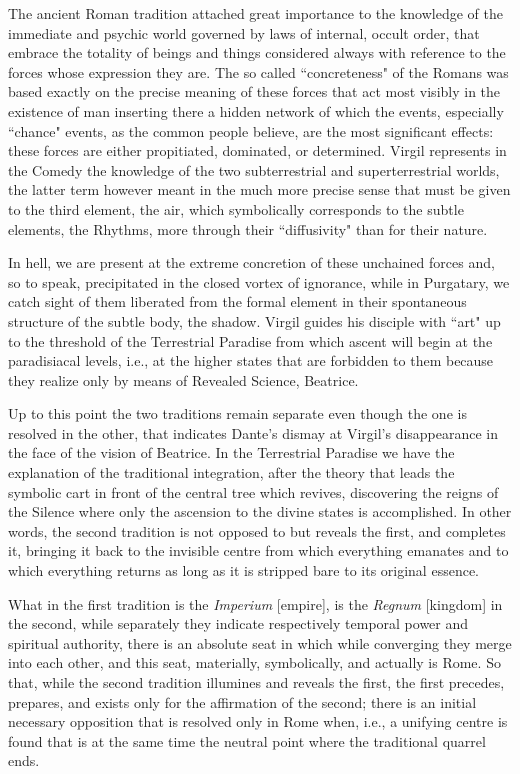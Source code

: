The ancient Roman tradition attached great importance to the knowledge of the immediate and psychic world governed by laws of internal, occult order, that embrace the totality of beings and things considered always with reference to the forces whose expression they are. The so called ``concreteness" of the Romans was based exactly on the precise meaning of these forces that act most visibly in the existence of man inserting there a hidden network of which the events, especially ``chance" events, as the common people believe, are the most significant effects: these forces are either propitiated, dominated, or determined. Virgil represents in the Comedy the knowledge of the two subterrestrial and superterrestrial worlds, the latter term however meant in the much more precise sense that must be given to the third element, the air, which symbolically corresponds to the subtle elements, the Rhythms, more through their ``diffusivity" than for their nature.

In hell, we are present at the extreme concretion of these unchained forces and, so to speak, precipitated in the closed vortex of ignorance, while in Purgatary, we catch sight of them liberated from the formal element in their spontaneous structure of the subtle body, the shadow. Virgil guides his disciple with ``art" up to the threshold of the Terrestrial Paradise from which ascent will begin at the paradisiacal levels, i.e., at the higher states that are forbidden to them because they realize only by means of Revealed Science, Beatrice.

Up to this point the two traditions remain separate even though the one is resolved in the other, that indicates Dante's dismay at Virgil's disappearance in the face of the vision of Beatrice. In the Terrestrial Paradise we have the explanation of the traditional integration, after the theory that leads the symbolic cart in front of the central tree which revives, discovering the reigns of the Silence where only the ascension to the divine states is accomplished. In other words, the second tradition is not opposed to but reveals the first, and completes it, bringing it back to the invisible centre from which everything emanates and to which everything returns as long as it is stripped bare to its original essence.

What in the first tradition is the \emph{Imperium} [empire], is the \emph{Regnum} [kingdom] in the second, while separately they indicate respectively temporal power and spiritual authority, there is an absolute seat in which while converging they merge into each other, and this seat, materially, symbolically, and actually is Rome. So that, while the second tradition illumines and reveals the first, the first precedes, prepares, and exists only for the affirmation of the second; there is an initial necessary opposition that is resolved only in Rome when, i.e., a unifying centre is found that is at the same time the neutral point where the traditional quarrel ends.

